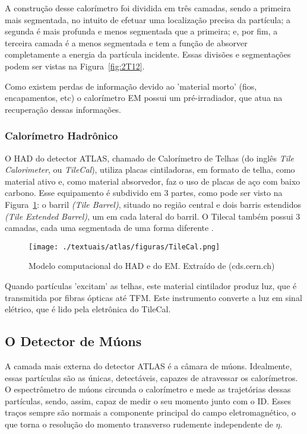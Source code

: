 A construção desse calorímetro foi dividida em três camadas, sendo a primeira mais segmentada, no intuito de efetuar uma localização precisa da partícula; a segunda é mais profunda e menos segmentada que a primeira; e, por fim, a terceira camada é a menos segmentada e tem a função de absorver completamente a energia da partícula incidente. Essas divisões e segmentações podem ser vistas na Figura~\ref{fig:2T12}.

Como existem perdas de informação devido ao 'material morto' (fios, encapamentos, etc) o calorímetro EM possui um pré-irradiador, que atua na recuperação dessas informações.

\subsubsection{Calorímetro Hadrônico}\label{subsec:cal_had}

O \ac{HAD} do detector ATLAS, chamado de Calorímetro de Telhas (do inglês \emph{Tile Calorimeter}, ou \emph{TileCal}), utiliza placas cintiladoras, em formato de telha, como material ativo e, como material absorvedor, faz o uso de placas de aço com baixo carbono. Esse equipamento é subdivido em 3 partes, como pode ser visto na Figura~\ref{fig:2T13}: o barril \emph{(Tile Barrel)}, situado no região central e dois barris estendidos \emph{(Tile Extended Barrel)}, um em cada lateral do barril. O Tilecal também possui 3 camadas, cada uma segmentada de uma forma diferente \cite{aad2010readiness}.

\begin{figure}[h!]
	\centering
	\texttt{[image: ./textuais/atlas/figuras/TileCal.png]}\\
	\caption{Modelo computacional do HAD e do EM. Extraído de (cds.cern.ch)}
	\label{fig:2T13}
\end{figure}

Quando partículas 'excitam' as telhas, este material cintilador produz luz, que é transmitida por fibras ópticas até \ac{TFM}. Este instrumento converte a luz em sinal elétrico, que é lido pela eletrônica do TileCal.

\subsection{O Detector de Múons}\label{subsec:cam_muon}

A camada mais externa do detector ATLAS é a câmara de múons. Idealmente, essas partículas são as únicas, detectáveis, capazes de atravessar os calorímetros. O espectrômetro de múons \cite{atlas2010commissioning} circunda o calorímetro e mede as trajetórias dessas partículas, sendo, assim, capaz de medir o seu momento junto com o ID. Esses traços sempre são normais a componente principal do campo eletromagnético, o que torna o resolução do momento transverso rudemente independente de $\eta$.

